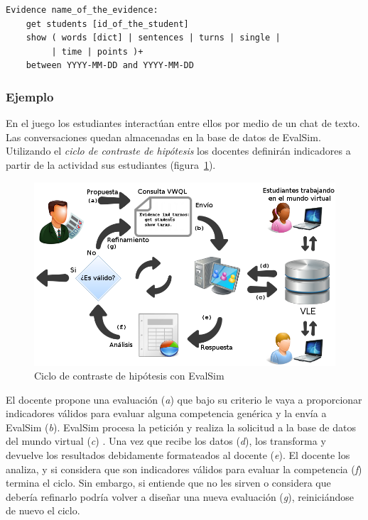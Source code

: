 \begin{verbatim}
Evidence name_of_the_evidence:
    get students [id_of_the_student]
    show ( words [dict] | sentences | turns | single |
         | time | points )+
    between YYYY-MM-DD and YYYY-MM-DD
\end{verbatim}

			\subsubsection*{Ejemplo}

			En el juego los estudiantes interactúan entre ellos por medio de un chat de texto. Las conversaciones quedan almacenadas en la base de datos de EvalSim. Utilizando el \emph{ciclo de contraste de hipótesis} los docentes definirán indicadores a partir de la actividad sus estudiantes (figura~\ref{fig:EvsDiagram}).

\begin{figure}
  \begin{center}
    \includegraphics[scale=0.4]{EvsDiagram.png}
  \end{center}
  \caption{Ciclo de contraste de hipótesis con EvalSim}
  \label{fig:EvsDiagram}
\end{figure}

			El docente propone una evaluación (\emph{a}) que bajo su criterio le vaya a proporcionar indicadores válidos para evaluar alguna competencia genérica y la envía a EvalSim (\emph{b}). EvalSim procesa la petición y realiza la solicitud a la base de datos del mundo virtual (\emph{c}) . Una vez que recibe los datos (\emph{d}), los transforma y devuelve los resultados debidamente formateados al docente (\emph{e}). El docente los analiza, y si considera que son indicadores válidos para evaluar la competencia (\emph{f}) termina el ciclo. Sin embargo, si entiende que no les sirven o considera que debería refinarlo podría volver a diseñar una nueva evaluación (\emph{g}), reiniciándose de nuevo el ciclo.



